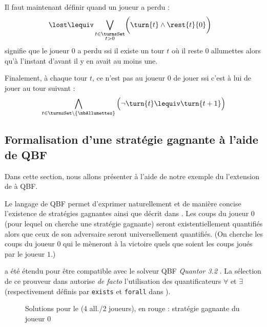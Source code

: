 Il faut maintenant définir quand un joueur a perdu :
\begin{gather}
\begin{split}
\lost \lequiv \bigvee_{\substack{t \in \turnsSet\\ t > 0}} & \bigg ( \turn{t} \land \rest{t}{0} %
\bigg )
\end{split}
\end{gather}
signifie que le joueur $0$ a perdu ssi il existe un tour $t$ où il reste $0$ allumettes alors qu'à l'instant d'avant il y en avait au moins une.

Finalement, à chaque tour $t$, ce n'est pas au joueur $0$ de jouer ssi c'est à lui de jouer au tour suivant :
\begin{gather}
\bigwedge_{t \in \turnsSet \setminus \{ \nbAllumettes \} } \Big (
    \neg \turn{t} \lequiv \turn{t+1}
\Big )
\label{eq:turnChange}
\end{gather}



\subsection{Formalisation d'une stratégie gagnante à l'aide de QBF}

Dans cette section, nous allons présenter à l'aide de notre exemple du \game l'extension de \touist à QBF.

Le langage de QBF permet d'exprimer naturellement et de manière concise l'existence de stratégies gagnantes ainsi que décrit dans \cite{DBLP:series/txtcs/KroeningS16}. Les coups du joueur 0 (pour lequel on cherche une stratégie gagnante) seront existentiellement quantifiés alors que ceux de son adversaire seront universellement quantifiés. (On cherche les coups du joueur $0$ qui le mèneront à la victoire quels que soient les coups joués par le joueur $1$.)

\touist a été étendu pour être compatible avec le solveur QBF \emph{Quantor 3.2} \cite{Biere:2004:RE:2103144.2103150}. La sélection de ce prouveur dans \touist autorise \emph{de facto} l'utilisation des quantificateurs $\forall$ et $\exists$ (respectivement définis par \verb+exists+ et \verb+forall+ dans \touist).

\begin{figure}
\centering

\caption{Solutions pour le \game (4 all./2 joueurs), en rouge : stratégie gagnante du joueur 0}
\label{fig:solutions}
\vspace{-0.5cm}\end{figure}

